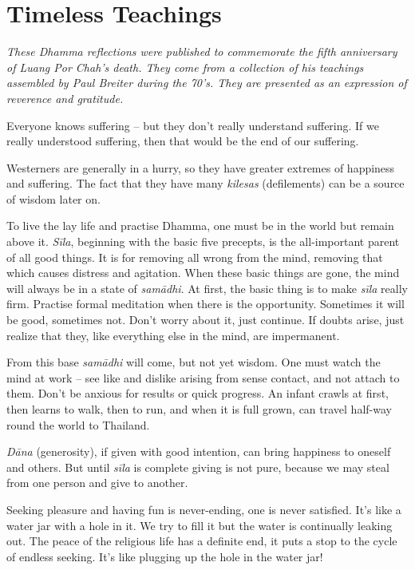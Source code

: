 
\chapter{Timeless Teachings}

\emph{These Dhamma reflections were published to commemorate the fifth
anniversary of Luang Por Chah's death. They come from a collection of
his teachings assembled by Paul Breiter during the
70's. They are presented as an expression of reverence and
gratitude.}

Everyone knows suffering -- but they don't really understand suffering.
If we really understood suffering, then that would be the end of our
suffering.

Westerners are generally in a hurry, so they have greater extremes of
happiness and suffering. The fact that they have many \emph{kilesas}
 (defilements) can be a source of wisdom later on.

To live the lay life and practise Dhamma, one must be in the world but
remain above it. \emph{Sīla}, beginning with the basic five precepts, is
the all-important parent of all good things. It is for removing all
wrong from the mind, removing that which causes distress and agitation. 
When these basic things are gone, the mind will always be in a state of
\emph{samādhi}. At first, the basic thing is to make \emph{sīla} really
firm. Practise formal meditation when there is the opportunity. 
Sometimes it will be good, sometimes not. Don't worry about it, just
continue. If doubts arise, just realize that they, like everything else
in the mind, are impermanent.

From this base \emph{samādhi} will come, but not yet wisdom. One must watch
the mind at work -- see like and dislike arising from sense contact, and
not attach to them. Don't be anxious for results or quick progress. An
infant crawls at first, then learns to walk, then to run, and when it is
full grown, can travel half-way round the world to Thailand. 

\emph{Dāna} (generosity), if given with good intention, can bring
happiness to oneself and others. But until \emph{sīla} is complete
giving is not pure, because we may steal from one person and give to
another. 

Seeking pleasure and having fun is never-ending, one is never satisfied. 
It's like a water jar with a hole in it. We try to fill it but the water
is continually leaking out. The peace of the religious life has a
definite end, it puts a stop to the cycle of endless seeking. It's like
plugging up the hole in the water jar! 

